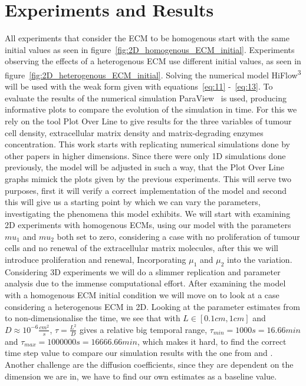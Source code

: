 

\section{Experiments and Results}

All experiments that consider the ECM to be homogenous start with the same initial values as seen in figure~\ref{fig:2D_homogenous_ECM_initial}. Experiments observing the effects of a heterogenous ECM use different initial values, as seen in figure~\ref{fig:2D_heterogenous_ECM_initial}.\newline 
Solving the numerical model HiFlow\textsuperscript{3} will be used with the weak form given with equations~\ref{eq:11} -~\ref{eq:13}. To evaluate the results of the numerical simulation ParaView~\cite{paraview} is used, producing informative plots to compare the evolution of the simulation in time. For this we rely on the tool Plot Over Line to give results for the three variables of tumour cell density, extracellular matrix density and matrix-degrading enzymes concentration.\newline
This work starts with replicating numerical simulations done by other papers in higher dimensions. Since there were only 1D simulations done previously, the model will be adjusted in such a way, that the Plot Over Line graphs mimick the plots given by the previous experiments. This will serve two purposes, first it will verify a correct implementation of the model and second this will give us a starting point by which we can vary the parameters, investigating the phenomena this model exhibits. \newline 
We will start with examining 2D experiments with homogenous ECMs, using our model with the parameters $mu_1$ and $mu_2$ both set to zero, considering a case with no proliferation of tumour cells and no renewal of the extracellular matrix molecules, after this we will introduce proliferation and renewal, Incorporating $\mu_1$ and $\mu_2$ into the variation.
Considering 3D experiments we will do a slimmer replication and parameter analysis due to the immense computational effort. After examining the model with a homogenous ECM initial condition we will move on to look at a case considering a heterogenous ECM in 2D.\newline
Looking at the parameter estimates from \cite{anderson_mathematical_2000} to non-dimensionalise the time, we see that with $L \in [0.1cm,1cm]$ and $D\approx 10^{-6}\frac{cm^2}{s}$, $\tau = \frac{L^2}{D}$ gives a relative big temporal range, $\tau_{min} = 1000s = 16.66 min$ and $\tau_{max} = 1000000s = 16666.66min$, which makes it hard, to find the correct time step value to compare our simulation results with the one from \cite{anderson_mathematical_2000} and \cite{Kolev2010}. Another challenge are the diffusion coefficients, since they are dependent on the dimension we are in, we have to find our own estimates as a baseline value. \newline 
